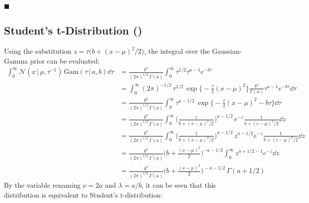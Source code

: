 \documentclass[11pt, a4paper]{scrartcl}
\newcommand{\given}{\,\vert\,}
\newcommand{\eot}{\hfill\(\blacksquare\)}
\newcommand{\diffstar}{\texorpdfstring{\raisebox{-1pt}{\resizebox{!}{8pt}{\(\star\)}}}{*}}
\newcommand{\onestar}  {(\diffstar)}
\begin{document}
			\eot

		\subsection{Student's t-Distribution  \onestar}
			Using the substitution \( z = \tau \big( b + (x - \mu)^2 / 2 \big) \), the integral over the Gaussian-Gamma prior can be evaluated:
			\begin{align}
				\int_{0}^{\infty}\! \mathcal{N}(x \given \mu, \tau^{-1}) \, \mathrm{Gam}(\tau \given a, b) \dd{\tau}
					&= \frac{b^a}{(2\pi)^{1/2} \, \Gamma(a)} \int_{0}^{\infty}\! \tau^{1/2} \tau^{a - 1} e^{-b\tau} \\
					&= \int_{0}^{\infty}\! (2\pi)^{-1/2} \, \tau^{1/2} \, \exp\bigg\{\! -\frac{\tau}{2} (x - \mu)^2 \bigg\} \frac{b^a}{\Gamma(a)} \tau^{a - 1} e^{-b\tau} \dd{\tau} \\
					&= \frac{b^a}{(2\pi)^{1/2} \, \Gamma(a)} \int_{0}^{\infty}\! \tau^{a - 1/2} \, \exp\bigg\{ \! -\frac{\tau}{2} (x - \mu)^2 - b \tau \bigg\} \dd{\tau} \\
					&= \frac{b^a}{(2\pi)^{1/2} \, \Gamma(a)} \int_{0}^{\infty}\! \bigg( \frac{z}{b + (x - \mu)^2 / 2} \bigg)^{a - 1/2} \, e^{-z} \frac{1}{b + (c - \mu)^2 / 2} \dd{z} \\
					&= \frac{b^a}{(2\pi)^{1/2} \, \Gamma(a)} \int_{0}^{\infty}\! \bigg( \frac{1}{b + (x - \mu)^2 / 2} \bigg)^{a - 1/2} \, z^{a - 1/2} e^{-z} \frac{1}{b + (c - \mu)^2 / 2} \dd{z} \\
					&= \frac{b^a}{(2\pi)^{1/2} \, \Gamma(a)} \bigg( b + \frac{(x - \mu)^2}{2} \bigg)^{-a - 1/2} \int_{0}^{\infty}\! z^{a + 1/2 - 1} e^{-z} \dd{z} \\
					&= \frac{b^a}{(2\pi)^{1/2} \, \Gamma(a)} \bigg( b + \frac{(x - \mu)^2}{2} \bigg)^{\!-a - 1/2} \, \Gamma(a + 1/2)
			\end{align}
			By the variable renaming \( \nu = 2a \) and \( \lambda = a/b \), it can be seen that this distribution is equivalent to Student's t-distribution:
\end{document}
